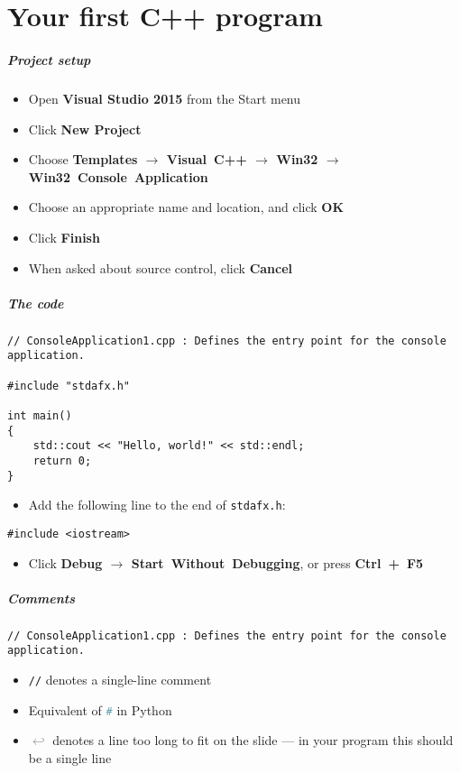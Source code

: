 \part{Your first C++ program}
\frame{\partpage}

\begin{frame}
	\frametitle{Project setup}
	\begin{itemize}
		\item Open \textbf{Visual Studio 2015} from the Start menu
		\item Click \textbf{New Project}
		\item Choose \textbf{Templates $\to$ Visual~C++ $\to$ Win32 $\to$ Win32~Console~Application}
		\item Choose an appropriate name and location, and click \textbf{OK}
		\item Click \textbf{Finish}
		\item When asked about source control, click \textbf{Cancel}
	\end{itemize}
\end{frame}

\begin{frame}[fragile]
	\frametitle{The code}
	\begin{lstlisting}
// ConsoleApplication1.cpp : Defines the entry point for the console application.

#include "stdafx.h"

int main()
{
    std::cout << "Hello, world!" << std::endl;
    return 0;
}
	\end{lstlisting}
	\begin{itemize}
		\item Add the following line to the end of \texttt{stdafx.h}:
	\end{itemize}
	\begin{lstlisting}
#include <iostream>
	\end{lstlisting}
	\begin{itemize}
		\item Click \textbf{Debug $\to$ Start~Without~Debugging}, or press \textbf{Ctrl~+~F5}
	\end{itemize}
\end{frame}

\begin{frame}[fragile]
	\frametitle{Comments}
	\begin{lstlisting}
// ConsoleApplication1.cpp : Defines the entry point for the console application.
	\end{lstlisting}
	\begin{itemize}
		\item \lstinline{//} denotes a single-line comment
		\item Equivalent of \lstinline[language=Python]{#} in Python
		\item \textcolor{Gray}{$\hookleftarrow$} denotes a line too long to fit on the slide ---
			in your program this should be a single line
	\end{itemize}
\end{frame}

